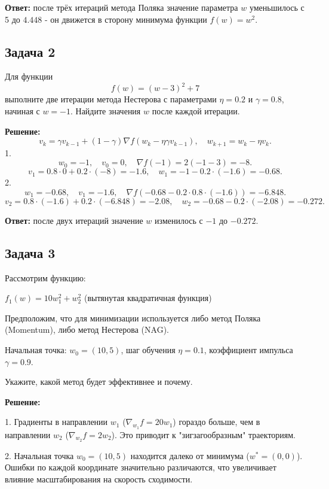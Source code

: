 \textbf{Ответ:} после трёх итераций метода Поляка значение параметра $w$ уменьшилось с 5 до $4.448$ - он движется в сторону минимума функции $f(w) = w^2$.

\subsection*{Задача 2}
Для функции 
\begin{equation*}
    f(w) = (w - 3)^2 + 7
\end{equation*}
выполните две итерации метода Нестерова с параметрами $\eta = 0.2$ и $\gamma = 0.8$, начиная с $w = -1$. Найдите значения $w$ после каждой итерации.

\textbf{Решение:}
\begin{equation*}
    v_k = \gamma v_{k-1} + (1 - \gamma) \nabla f(w_k - \eta \gamma v_{k-1}), \quad w_{k+1} = w_k - \eta v_k.
\end{equation*}
1.
\[
   w_0 = -1, \quad v_0 = 0, \quad \nabla f(-1) = 2(-1 - 3) = -8.
\]
\[ v_1 = 0.8 \cdot 0 + 0.2 \cdot (-8) = -1.6, \quad w_1 = -1 - 0.2 \cdot (-1.6) = -0.68. \]
2. 
\[
   w_1 = -0.68, \quad v_1 = -1.6, \quad \nabla f(-0.68 - 0.2 \cdot 0.8 \cdot (-1.6)) = -6.848.
\]
\[ v_2 = 0.8 \cdot (-1.6) + 0.2 \cdot (-6.848) = -2.08, \quad w_2 = -0.68 - 0.2 \cdot (-2.08) = -0.272. \]

\textbf{Ответ:} после двух итераций значение $w$ изменилось с $-1$ до $-0.272$.

\subsection*{Задача 3}
Рассмотрим функцию:  
 \item\( f_1(w) = 10w_1^2 + w_2^2 \) (вытянутая квадратичная функция)   

Предположим, что для минимизации используется либо метод Поляка (Momentum), либо метод Нестерова (NAG).  
\item Начальная точка: \( w_0 = (10, 5) \),  шаг обучения \( \eta = 0.1 \),   коэффициент импульса \( \gamma = 0.9 \).  

Укажите, какой метод будет эффективнее и почему.

\textbf{Решение:}

1. Градиенты в направлении \( w_1 \) (\( \nabla_{w_1} f = 20w_1 \)) гораздо больше, чем в направлении \( w_2 \) (\( \nabla_{w_2} f = 2w_2 \)). Это приводит к "зигзагообразным" траекториям.

2. Начальная точка \( w_0 = (10, 5) \) находится далеко от минимума (\( w^* = (0, 0) \)). Ошибки по каждой координате значительно различаются, что увеличивает влияние масштабирования на скорость сходимости.

